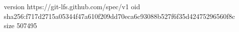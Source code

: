 version https://git-lfs.github.com/spec/v1
oid sha256:f717d2715a05344f47a610f209dd70eca6c93088b527f6f35d42475296560f8c
size 507495
